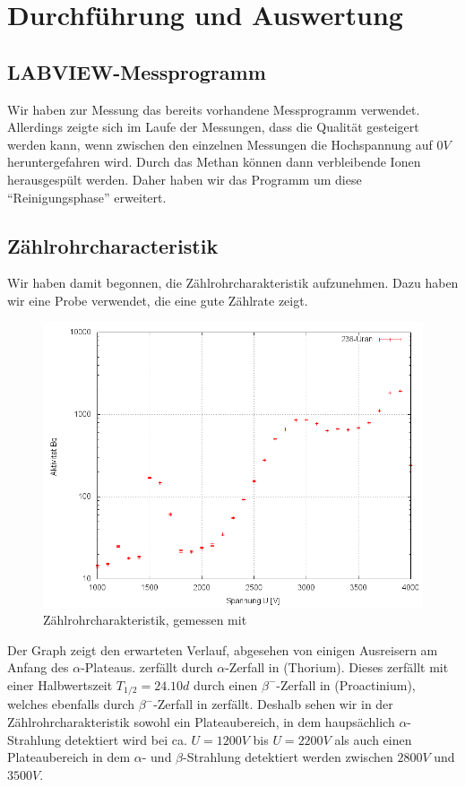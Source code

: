 \section{Durchführung und Auswertung}

\subsection{LABVIEW-Messprogramm}

Wir haben zur Messung das bereits vorhandene Messprogramm verwendet. Allerdings zeigte sich im Laufe der Messungen, dass die Qualität gesteigert werden kann, wenn zwischen den einzelnen Messungen die Hochspannung auf $0V$ heruntergefahren wird. Durch das Methan können dann verbleibende Ionen herausgespült werden. Daher haben wir das Programm um diese "`Reinigungsphase"' erweitert.

\subsection{Zählrohrcharacteristik}

Wir haben damit begonnen, die Zählrohrcharakteristik aufzunehmen. Dazu haben wir eine  Probe verwendet, die eine gute Zählrate zeigt.

\begin{figure}[H]
 \centering \includegraphics[width=0.9\linewidth]{Messwerte/plots/U238.png}
 \caption{Zählrohrcharakteristik, gemessen mit }
\end{figure}

Der Graph zeigt den erwarteten Verlauf, abgesehen von einigen Ausreisern am Anfang des $\alpha$-Plateaus.  zerfällt durch $\alpha$-Zerfall in  (Thorium). Dieses zerfällt mit einer Halbwertszeit $T_{1/2} = 24.10d$ durch einen $\beta^-$-Zerfall in  (Proactinium), welches ebenfalls durch $\beta^-$-Zerfall in  zerfällt. Deshalb sehen wir in der Zählrohrcharakteristik sowohl ein Plateaubereich, in dem haupsächlich $\alpha$-Strahlung detektiert wird bei ca. $U = 1200V$ bis $U = 2200V$ als auch einen Plateaubereich in dem $\alpha$- und $\beta$-Strahlung detektiert werden zwischen $2800V$ und $3500V$.

